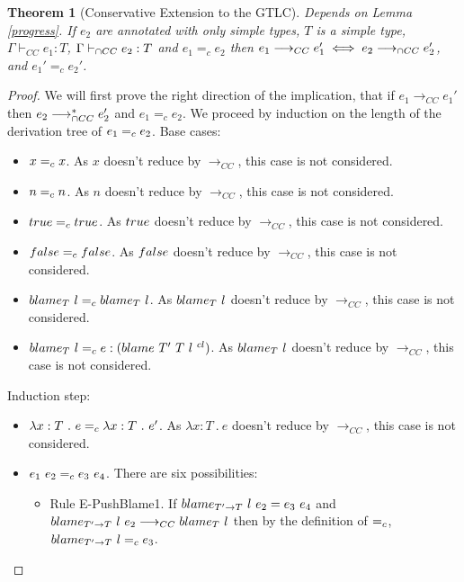 \documentclass[a4paper]{article}
\newtheorem{theorem}{Theorem}[section]
\begin{document}
\begin{theorem}[Conservative Extension to the GTLC]
\label{conservative_extension_intersection_cast_insertion}
Depends on Lemma \ref{progress}.
If $e_2$ are annotated with only simple types, $T$ is a simple type, $\Gamma \vdash_{CC} e_1 : T$, $\Gamma \vdash_{\cap CC} e_2 : T$ and $e_1 =_{c} e_2$ then $e_1 \longrightarrow_{CC} e_1' \iff e_2 \longrightarrow_{\cap CC} e_2'$, and $e_1' =_{c} e_2'$.
\end{theorem}
\begin{proof}
We will first prove the right direction of the implication, that if $e_1 \longrightarrow_{CC} e_1'$ then $e_2 \longrightarrow_{\cap CC}^* e_2'$ and $e_1 =_{c} e_2$.
We proceed by induction on the length of the derivation tree of $e_1 =_c e_2$.
Base cases:
\begin{itemize}
    \item $x =_c x$.
    As $x$ doesn't reduce by $\longrightarrow_{CC}$, this case is not considered.
    \item $n =_c n$.
    As $n$ doesn't reduce by $\longrightarrow_{CC}$, this case is not considered.
    \item $true =_c true$.
    As $true$ doesn't reduce by $\longrightarrow_{CC}$, this case is not considered.
    \item $false =_c false$.
    As $false$ doesn't reduce by $\longrightarrow_{CC}$, this case is not considered.
    \item $blame_{T}\ l =_c blame_{T}\ l$.
    As $blame_{T}\ l$ doesn't reduce by $\longrightarrow_{CC}$, this case is not considered.
    \item $blame_{T}\ l =_c e : (blame\ T'\ T\ l\ ^{cl})$.
    As $blame_{T}\ l$ doesn't reduce by $\longrightarrow_{CC}$, this case is not considered.
\end{itemize}
Induction step:
\begin{itemize}
    \item $\lambda x : T\ .\ e =_c \lambda x : T\ .\ e'$.
    As $\lambda x : T\ .\ e$ doesn't reduce by $\longrightarrow_{CC}$, this case is not considered.
    \item $e_1\ e_2 \equalityCasts e_3\ e_4$.
    There are six possibilities:
    \begin{itemize}
        \item Rule E-PushBlame1.
        If $blame_{T' \rightarrow T}\ l\ e_2 = e_3\ e_4$ and $blame_{T' \rightarrow T}\ l\ e_2 \longrightarrow_{CC} blame_{T}\ l$ then by the definition of $=_c$, $blame_{T' \rightarrow T}\ l =_c e_3$.

\end{itemize}
\end{itemize}
\end{proof}
\end{document}
